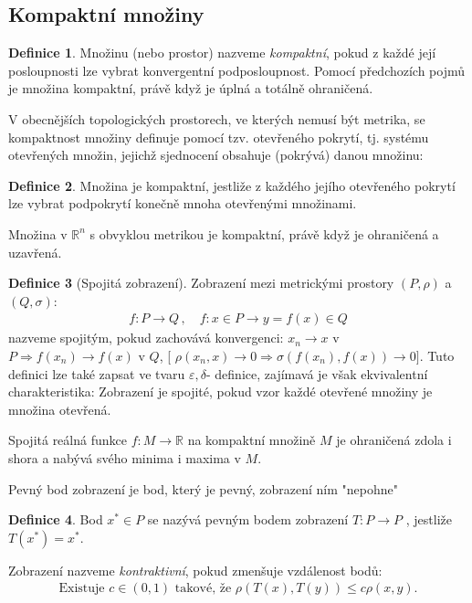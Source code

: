 \documentclass[a4]{report}
\theoremstyle{definition}
\newtheorem{definition}{Definice}[section]
\begin{document}
{\subsection{Kompaktní množiny}
\begin{definition}
Množinu (nebo prostor) nazveme \textit{kompaktní}, pokud z každé její posloupnosti lze vybrat konvergentní podposloupnost. Pomocí předchozích pojmů je množina kompaktní, právě když je úplná a totálně ohraničená. 
\end{definition}
V obecnějších topologických prostorech, ve
kterých nemusí být metrika, se kompaktnost množiny definuje pomocí tzv. otevřeného
pokrytí, tj. systému otevřených množin, jejichž sjednocení obsahuje (pokrývá) danou množinu:
\begin{definition}
Množina je kompaktní, jestliže z každého jejího otevřeného pokrytí lze vybrat podpokrytí konečně mnoha otevřenými množinami.
\end{definition}
Množina v $\mathbb{R}^n$ s obvyklou metrikou je kompaktní, právě když je ohraničená a uzavřená.
\begin{definition}[Spojitá zobrazení]
Zobrazení mezi metrickými prostory $(P,\rho)$ a $(Q, \sigma)$:
\begin{align*}
f: P\rightarrow Q\,, \quad f: x\in P\rightarrow y=f(x)\in Q
\end{align*}
nazveme spojitým, pokud zachovává konvergenci:
$x_n\rightarrow x$ v $P \Rightarrow f(x_n)\rightarrow f(x)$ v $Q$, [ $\rho(x_n, x)\rightarrow 0\Rightarrow \sigma(f(x_n), f(x))\rightarrow 0]$.
Tuto definici lze také zapsat ve tvaru $\varepsilon, \delta$- definice, zajímavá je však ekvivalentní charakteristika: Zobrazení je spojité, pokud vzor každé otevřené množiny je množina otevřená.
\end{definition}
Spojitá reálná funkce $f: M \rightarrow \mathbb{R}$ na kompaktní množině $M$ je ohraničená zdola i shora a nabývá svého minima i maxima v $M$.


Pevný bod zobrazení je bod, který je pevný, zobrazení ním "nepohne"
\begin{definition}
Bod $x^* \in P$ se nazývá pevným bodem zobrazení $T:P\rightarrow P$ , jestliže $T(x^*)=x^*$.
\end{definition}

Zobrazení nazveme \textit{kontraktivní}, pokud zmenšuje vzdálenost bodů:
\begin{align*}
\text{Existuje } c\in (0,1) \text{ takové, že } \rho(T(x), T(y))\leq c\rho(x, y).
\end{align*}

}
\end{document}
